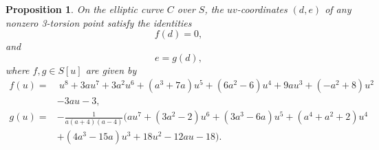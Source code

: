 \documentclass{gtpart}
\newtheorem{prop}[thm]{Proposition}
\theoremstyle{definition}
\theoremstyle{remark}
\begin{document}
\begin{prop}
\label{prop:tors}
 On the elliptic curve $C$ over $S$, the $uv$-coordinates $(d,e)$ of any nonzero 3-torsion point satisfy the identities 
 \[
  f(d) = 0, 
 \]
 and 
 \[
  e = g(d), 
 \]
 where $f, g \in S[u]$ are given by 
 \begin{equation*}
 \begin{split}
  f(u) = & ~ u^8 + 3 a u^7 + 3 a^2 u^6 + (a^3 + 7 a) u^5 + (6 a^2 - 6) u^4 + 9 a u^3 + (-a^2 + 8) u^2 \\
         & - 3 a u - 3, \\
  g(u) = & -\frac{1}{a (a + 4) (a - 4)} \big(a u^7 + (3 a^2 - 2) u^6 + (3 a^3 - 6 a) u^5 + (a^4 + a^2 + 2) u^4 \\
         & + (4 a^3 - 15 a) u^3 + 18 u^2 - 12 a u - 18\big).  
 \end{split}
 \end{equation*}
\end{prop}
\end{document}
